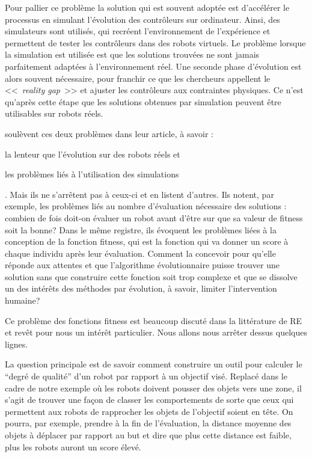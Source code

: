 Pour pallier ce problème la solution qui est souvent adoptée est d'accélérer le processus en simulant l'évolution des contrôleurs sur ordinateur. Ainsi, des simulateurs sont utilisés, qui recréent l'environnement de l'expérience et permettent de tester les contrôleurs dans des robots virtuels. Le problème lorsque la simulation est utilisée est que les solutions trouvées ne sont jamais parfaitement adaptées à l'environnement réel. Une seconde phase d'évolution est alors souvent nécessaire, pour franchir ce que les chercheurs appellent le <<~\emph{reality gap}~>> et ajuster les contrôleurs aux contraintes physiques. Ce n'est qu'après cette étape que les solutions obtenues par simulation peuvent être utilisables sur robots réels.

\cite{mataric96challengesinevolvingcontrollersforphysicalrobots} soulèvent ces deux problèmes dans leur article, à savoir :
\begin{inparaenum}
\item la lenteur que l'évolution sur des robots réels et
\item les problèmes liés à l'utilisation des simulations
\end{inparaenum}. Mais ils ne s'arrêtent pas à ceux-ci et en listent d'autres. Ils notent, par exemple, les problèmes liés au nombre d'évaluation nécessaire des solutions : combien de fois doit-on évaluer un robot avant d'être sur que sa valeur de fitness soit la bonne? Dans le même registre, ils évoquent les problèmes liées à la conception de la fonction fitness, qui est la fonction qui va donner un score à chaque individu après leur évaluation. Comment la concevoir pour qu'elle réponde aux attentes et que l'algorithme évolutionnaire puisse trouver une solution sans que construire cette fonction soit trop complexe et que se dissolve un des intérêts des méthodes par évolution, à savoir, limiter l'intervention humaine?

Ce problème des fonctions fitness est beaucoup discuté dans la littérature de RE et revêt pour nous un intérêt particulier. Nous allons nous arrêter dessus quelques lignes.

La question principale est de savoir comment construire un outil pour calculer le ``degré de qualité'' d'un robot par rapport à un objectif visé. Replacé dans le cadre de notre exemple où les robots doivent pousser des objets vers une zone, il s'agit de trouver une façon de classer les comportements de sorte que ceux qui permettent aux robots de rapprocher les objets de l'objectif soient en tête. On pourra, par exemple, prendre à la fin de l'évaluation, la distance moyenne des objets à déplacer par rapport au but et dire que plus cette distance est faible, plus les robots auront un score élevé.

